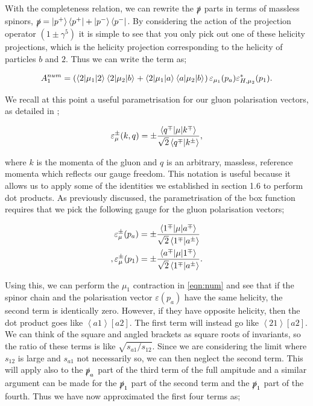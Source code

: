 With the completeness relation, we can rewrite the $\slashed{p}$ parts in terms of massless spinors,  $\slashed{p} = \left| p^+ \right> \left<p^+ \right| + \left| p^- \right> \left<p^- \right|$. By considering the action of the projection operator $(1\pm \gamma^5)$ it is simple to see that you only pick out one of these helicity projections, which is the helicity projection corresponding to the helicity of particles $b$ and $2$. Thus we can write the term as;

\begin{equation}
A_1^{num} = \left(\mathinner{\langle2\vert\mu_1\vert2\rangle}_{}\mathinner{\langle2\vert\mu_2\vert b\rangle}_{} + \mathinner{\langle2\vert\mu_1\vert a\rangle}_{}\mathinner{\langle a\vert\mu_2\vert b\rangle}_{}\right)\varepsilon_{\mu_1}(p_a)\varepsilon^*_{H,\mu_2}(p_1).
\label{eqn:num}
\end{equation}

We recall at this point a useful parametrisation for our gluon polarisation vectors, as detailed in \cite{Dixon1996};

\begin{equation}
\varepsilon_\mu^{\pm}(k,q) = \pm \frac{\mathinner{\langle q^\mp\vert\mu\vert k^\mp\rangle}_{}}{\sqrt{2} \left<q^\mp | k^\pm \right>},
\end{equation}

where $k$ is the momenta of the gluon and $q$ is an arbitrary, massless, reference momenta which reflects our gauge freedom. This notation is useful because it allows us to apply some of the identities we established in section 1.6 to perform dot products. As previously discussed, the parametrisation of the box function requires that we pick the following gauge for the gluon polarisation vectors;

\begin{equation}
\begin{split}
\varepsilon_\mu^{\pm}(p_a) &= \pm \frac{\mathinner{\langle1^\mp\vert\mu\vert a^\mp\rangle}_{}}{\sqrt{2} \left<1^\mp | a^\pm \right>} \\,
\varepsilon_\mu^{\pm}(p_1) &= \pm \frac{\mathinner{\langle a^\mp\vert\mu\vert1^\mp\rangle}_{}}{\sqrt{2} \left<1^\mp | a^\pm \right>}.
\end{split}
\end{equation}

Using this, we can perform the $\mu_1$ contraction in \ref{eqn:num} and see that if the spinor chain and the polarisation vector $\varepsilon(p_a)$ have the same helicity, the second term is identically zero. However, if they have opposite helicity, then the dot product goes like $\left<a 1 \right> [ a 2]$. The first term will instead go like $\left<2 1 \right>[a 2]$. We can think of the square and angled brackets as square roots of invariants, so the ratio of these terms is like $\sqrt{s_{a1}/s_{12}}$. 
Since we are considering the limit where $s_{12}$ is large and $s_{a1}$ not necessarily so, we can then neglect the second term. This will apply also to the $\slashed{p}_a$ part of the third term of the full ampitude and a similar argument can be made for the $\slashed{p}_1$ part of the second term and the $\slashed{p}_1$ part of the fourth. Thus we have now approximated the first four terms as;

